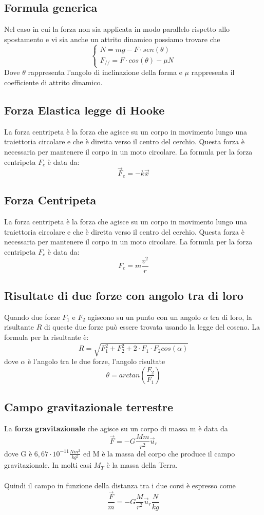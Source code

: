 \documentclass{article}
\begin{document}
\subsection{Formula generica}
Nel caso in cui la forza non sia applicata in modo parallelo rispetto allo spostamento e vi sia anche un attrito dinamico possiamo trovare che
\[
\begin{cases}
  N = mg - F \cdot sen(\theta) \\
  F_{//} = F \cdot cos(\theta) - \mu N
\end{cases}
\]
Dove \(\theta\) rappresenta l'angolo di inclinazione della forma e \(\mu\) rappresenta il coefficiente di attrito dinamico.
\subsection{Forza Elastica legge di Hooke}
La forza centripeta è la forza che agisce su un corpo in movimento lungo una traiettoria circolare e che è diretta verso il centro del cerchio. Questa forza è necessaria per mantenere il corpo in un moto circolare. La formula per la forza centripeta \( F_c \) è data da:
\[
    \Vec{F}_e = - k\Vec{x}
\]
\subsection{Forza Centripeta}
La forza centripeta è la forza che agisce su un corpo in movimento lungo una traiettoria circolare e che è diretta verso il centro del cerchio. Questa forza è necessaria per mantenere il corpo in un moto circolare. La formula per la forza centripeta \( F_c \) è data da:
\[
    F_c = m \frac{v^2}{r}
\]
\subsection{Risultate di due forze con angolo tra di loro}
Quando due forze \( F_1 \) e \( F_2 \) agiscono su un punto con un angolo \( \alpha \) tra di loro, la risultante \( R \) di queste due forze può essere trovata usando la legge del coseno. La formula per la risultante è:
\[
R = \sqrt{F_1^2 + F_2^2 + 2 \cdot F_1 \cdot F_2 cos(\alpha)}
\]
dove \(\alpha\) è l'angolo tra le due forze, l'angolo risultate
\[
    \theta = arctan(\frac{F_2}{F_1})
\]
\subsection{Campo gravitazionale terrestre}
La \textbf{forza gravitazionale} che agisce su un corpo di massa m è data da
\[
    \Vec{F} = -G\frac{Mm}{r^2}\Vec{u}_r
\]
dove G è \(6,67 \cdot 10^{-11} \frac{Nm^2}{kg^2}\) ed M è la massa del corpo che produce il campo gravitazionale. In molti casi \(M_T\) è la massa della Terra.\\
\\
Quindi il campo in funzione della distanza tra i due corsi è espresso come
\[
    \frac{\Vec{F}}{m} = -G\frac{M}{r^2}\Vec{u}_r \frac{N}{kg} 
\]
\end{document}
